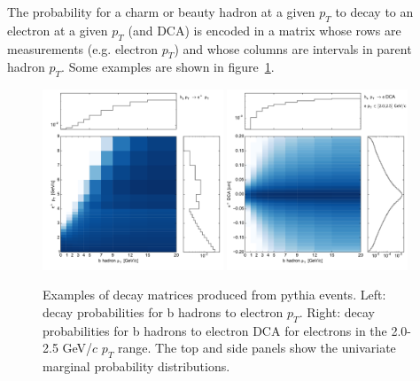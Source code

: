 \documentclass[12pt]{article}
\begin{document}
The probability for a charm or beauty hadron at a given $p_T$ to decay to an electron at a given $p_T$ (and DCA) is encoded in a matrix whose rows are measurements (e.g. electron $p_T$) and whose columns are intervals in parent hadron $p_T$. Some examples are shown in figure~\ref{fig:mat}.
\begin{figure}[tb]
  \begin{center}
    \includegraphics[width=0.48\textwidth]{eptmat_b}
    \quad
    \includegraphics[width=0.48\textwidth]{dcamat_b_2}
  \end{center}
  \caption{Examples of decay matrices produced from pythia events. Left: decay probabilities for b hadrons to electron $p_T$. Right: decay probabilities for b hadrons to electron DCA for electrons in the 2.0-2.5 GeV/$c$ $p_T$ range. The top and side panels show the univariate marginal probability distributions.}
  \label{fig:mat}
\end{figure}
\end{document}
